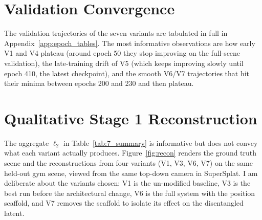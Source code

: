 \section{Validation Convergence}
\label{sec:results_convergence}

The validation trajectories of the seven variants are tabulated in full in Appendix~\ref{app:epoch_tables}. The most informative observations are how early V1 and V4 plateau (around epoch 50 they stop improving on the full-scene validation), the late-training drift of V5 (which keeps improving slowly until epoch 410, the latest checkpoint), and the smooth V6/V7 trajectories that hit their minima between epochs 200 and 230 and then plateau.

\section{Qualitative Stage 1 Reconstruction}
\label{sec:results_quality}

The aggregate $\ell_2$ in Table~\ref{tab:7_summary} is informative but does not convey what each variant actually produces. Figure~\ref{fig:recon} renders the ground truth scene and the reconstructions from four variants (V1, V3, V6, V7) on the same held-out gym scene, viewed from the same top-down camera in SuperSplat. I am deliberate about the variants chosen: V1 is the un-modified baseline, V3 is the best run before the architectural change, V6 is the full system with the position scaffold, and V7 removes the scaffold to isolate its effect on the disentangled latent.

